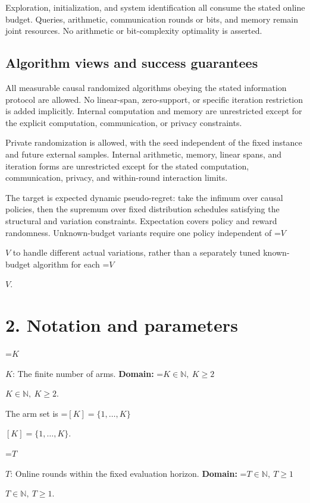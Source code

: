 \documentclass[10pt,a4paper]{article}
\newcommand{\AtlasMath}[1]{\par\begingroup\centering\setbox0=\hbox{$\displaystyle #1$}\ifdim\wd0>1.4\linewidth\typeout{ATLAS WIDE FORMULA: \the\wd0}\fi\ifdim\wd0>\linewidth\resizebox{\linewidth}{!}{\box0}\else\box0\fi\par\endgroup}
\newcommand{\AtlasInlineMath}[1]{\begingroup\setbox0=\hbox{$#1$}\ifdim\wd0>.4\linewidth\endgroup\AtlasMath{#1}\else\endgroup$#1$\fi}
\begin{document}
Exploration, initialization, and system identification all consume the stated online budget. Queries, arithmetic, communication rounds or bits, and memory remain joint resources. No arithmetic or bit-complexity optimality is asserted.



\subsection{Algorithm views and success guarantees}


All measurable causal randomized algorithms obeying the stated information protocol are allowed. No linear-span, zero-support, or specific iteration restriction is added implicitly. Internal computation and memory are unrestricted except for the explicit computation, communication, or privacy constraints.



Private randomization is allowed, with the seed independent of the fixed instance and future external samples. Internal arithmetic, memory, linear spans, and iteration forms are unrestricted except for the stated computation, communication, privacy, and within-round interaction limits.



The target is expected dynamic pseudo-regret: take the infimum over causal policies, then the supremum over fixed distribution schedules satisfying the structural and variation constraints. Expectation covers policy and reward randomness. Unknown-budget variants require one policy independent of \AtlasInlineMath{V} to handle different actual variations, rather than a separately tuned known-budget algorithm for each \AtlasInlineMath{V}.



\section{2. Notation and parameters}


\AtlasInlineMath{K}: The finite number of arms. \textbf{Domain:} \AtlasInlineMath{K\in\mathbb N,\ K\ge2}.



The arm set is \AtlasInlineMath{[K]=\{1,\ldots,K\}}.



\AtlasInlineMath{T}: Online rounds within the fixed evaluation horizon. \textbf{Domain:} \AtlasInlineMath{T\in\mathbb N,\ T\ge1}.
\end{document}
